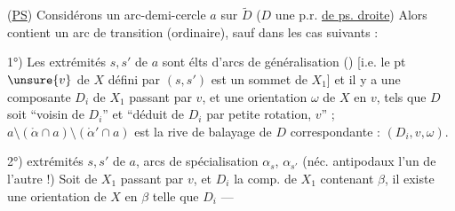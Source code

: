 (\uline{PS}) Considérons un arc-demi-cercle $a$
sur $\widetilde D$ ($D$ une p.r. \uline{de ps. droite})
Alors  contient un arc de transition
(ordinaire), sauf dans les  cas suivants :

1°)  Les extrémités $s,s'$ de $a$  sont élts
d'arcs de généralisation  ()
[i.e. le pt $\unsure{v}$ de $X$ défini par $(s,s')$ est
un sommet de $X_1$] et il y a une
composante $D_i$ de $X_1$ passant par $v$,
et une orientation $\omega$ de $X$ en $v$, tels
que $D$ soit  ``voisin de $D_i$''
et ``déduit de $D_i$ par petite rotation,
 $v$'' ; $a\setminus(\mathring\alpha\cap a)\setminus(\mathring\alpha'\cap a)$
est la rive de balayage de $D$
correspondante : $(D_i,v,\omega)$.

2°)   extrémités $s,s'$ de $a$,
    arcs de spécialisation
$\alpha_s$, \deleted{$\unsure{\beta}$}$\alpha_{s'}$ (néc. antipodaux l'un
de l'autre !)  
Soit \deleted{$\unsure{\beta}$}\inserted{$\beta$} de $X_1$ passant par $v$,  et $D_i$
la comp. de $X_1$ contenant $\beta$, il existe
une orientation de $X$ en $\beta$ telle que
$D_i$  —

